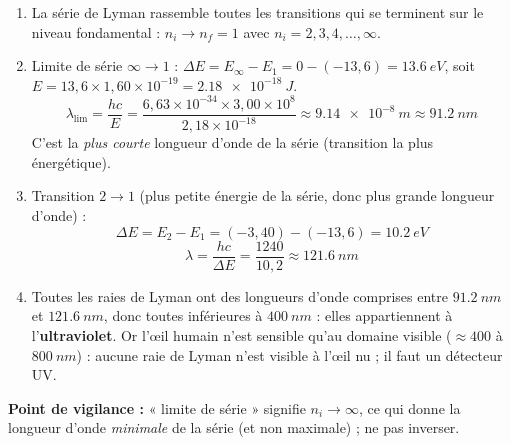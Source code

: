 \documentclass[11pt]{article}
\begin{document}
\begin{corrige}
\begin{enumerate}
\item La série de Lyman rassemble toutes les transitions qui se terminent sur le niveau fondamental : $n_i \to n_f = 1$ avec $n_i = 2, 3, 4, \dots, \infty$.
\item Limite de série $\infty \to 1$ : $\Delta E = E_\infty - E_1 = 0 - (-13,6) = \SI{13,6}{eV}$, soit $E = 13,6 \times 1,60\times 10^{-19} = \SI{2,18e-18}{J}$.
\[
\lambda_{\text{lim}} = \frac{hc}{E} = \frac{6,63\times 10^{-34}\times 3,00\times 10^{8}}{2,18\times 10^{-18}} \approx \SI{9,14e-8}{m} \approx \SI{91,2}{nm}
\]
C'est la \emph{plus courte} longueur d'onde de la série (transition la plus énergétique).
\item Transition $2 \to 1$ (plus petite énergie de la série, donc plus grande longueur d'onde) :
\[
\Delta E = E_2 - E_1 = (-3,40) - (-13,6) = \SI{10,2}{eV}
\]
\[
\lambda = \frac{hc}{\Delta E} = \frac{1240}{10,2} \approx \SI{121,6}{nm}
\]
\item Toutes les raies de Lyman ont des longueurs d'onde comprises entre $\SI{91,2}{nm}$ et $\SI{121,6}{nm}$, donc toutes inférieures à $\SI{400}{nm}$ : elles appartiennent à l'\textbf{ultraviolet}. Or l'œil humain n'est sensible qu'au domaine visible ($\approx 400$ à $\SI{800}{nm}$) : aucune raie de Lyman n'est visible à l'œil nu ; il faut un détecteur UV.
\end{enumerate}
\textbf{Point de vigilance :} « limite de série » signifie $n_i \to \infty$, ce qui donne la longueur d'onde \emph{minimale} de la série (et non maximale) ; ne pas inverser.
\end{corrige}
\end{document}
